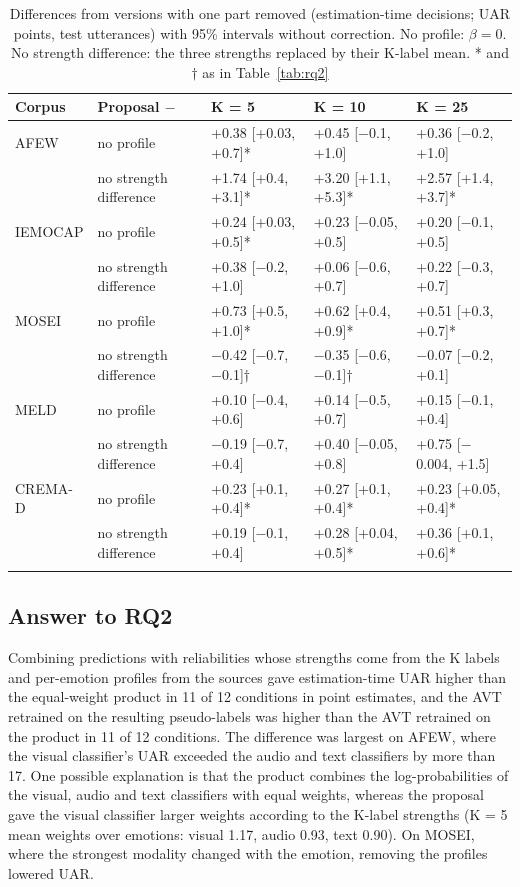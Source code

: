 \begin{table}[!htb]
\caption{Differences from versions with one part removed (estimation-time decisions; UAR points, test utterances) with 95\% intervals without correction. No profile: $\beta=0$. No strength difference: the three strengths replaced by their K-label mean. * and $\dagger$ as in Table~\ref{tab:rq2}}\label{tab:ablation}
\footnotesize\setlength{\tabcolsep}{4pt}
\begin{tabular}{@{}lllll@{}}
\toprule
Corpus & Proposal $-$ & K = 5 & K = 10 & K = 25 \\
\midrule
AFEW & no profile & +0.38 [+0.03, +0.7]* & +0.45 [$-$0.1, +1.0] & +0.36 [$-$0.2, +1.0] \\
 & no strength difference & +1.74 [+0.4, +3.1]* & +3.20 [+1.1, +5.3]* & +2.57 [+1.4, +3.7]* \\
IEMOCAP & no profile & +0.24 [+0.03, +0.5]* & +0.23 [$-$0.05, +0.5] & +0.20 [$-$0.1, +0.5] \\
 & no strength difference & +0.38 [$-$0.2, +1.0] & +0.06 [$-$0.6, +0.7] & +0.22 [$-$0.3, +0.7] \\
MOSEI & no profile & +0.73 [+0.5, +1.0]* & +0.62 [+0.4, +0.9]* & +0.51 [+0.3, +0.7]* \\
 & no strength difference & $-$0.42 [$-$0.7, $-$0.1]$\dagger$ & $-$0.35 [$-$0.6, $-$0.1]$\dagger$ & $-$0.07 [$-$0.2, +0.1] \\
MELD & no profile & +0.10 [$-$0.4, +0.6] & +0.14 [$-$0.5, +0.7] & +0.15 [$-$0.1, +0.4] \\
 & no strength difference & $-$0.19 [$-$0.7, +0.4] & +0.40 [$-$0.05, +0.8] & +0.75 [$-$0.004, +1.5] \\
CREMA-D & no profile & +0.23 [+0.1, +0.4]* & +0.27 [+0.1, +0.4]* & +0.23 [+0.05, +0.4]* \\
 & no strength difference & +0.19 [$-$0.1, +0.4] & +0.28 [+0.04, +0.5]* & +0.36 [+0.1, +0.6]* \\
\botrule
\end{tabular}
\end{table}

\subsection{Answer to RQ2}
Combining predictions with reliabilities whose strengths come from the K labels and per-emotion profiles from the sources gave estimation-time UAR higher than the equal-weight product in 11 of 12 conditions in point estimates, and the AVT retrained on the resulting pseudo-labels was higher than the AVT retrained on the product in 11 of 12 conditions. The difference was largest on AFEW, where the visual classifier's UAR exceeded the audio and text classifiers by more than 17\pt. One possible explanation is that the product combines the log-probabilities of the visual, audio and text classifiers with equal weights, whereas the proposal gave the visual classifier larger weights according to the K-label strengths (K = 5 mean weights over emotions: visual 1.17, audio 0.93, text 0.90). On MOSEI, where the strongest modality changed with the emotion, removing the profiles lowered UAR.

